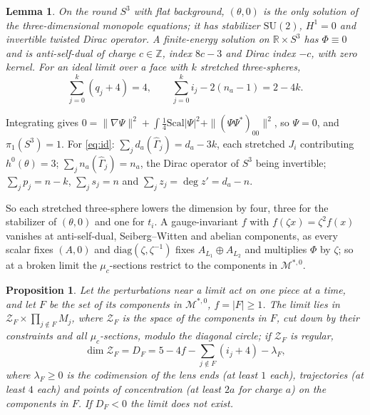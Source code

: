 \documentclass[10pt]{amsart}
\makeatletter
\numberwithin{equation}{section}
\theoremstyle{compact}
\newtheorem{proposition}[theorem]{Proposition}
\newtheorem{lemma}[theorem]{Lemma}
\renewenvironment{proof}[1][\proofname]{\par\pushQED{\qed}\normalfont
  \topsep4\p@\relax\trivlist\item[\hskip\labelsep\itshape#1\@addpunct{.}]%
  \ignorespaces}{\popQED\endtrivlist\@endpefalse}
\newcommand{\Z}{\mathbb Z}
\newcommand{\SU}{\mathrm{SU}}
\newcommand{\cM}{\mathcal M}
\newcommand{\cZ}{\mathcal Z}
\newcommand{\Ms}{\cM^{*,0}}
\makeatother
\begin{document}
\begin{lemma}\label{lem:S3}
On the round $S^3$ with flat background, $(\theta,0)$ is the only solution of
the three-dimensional monopole equations; it has stabilizer $\SU(2)$, $H^1=0$
and invertible twisted Dirac operator. A finite-energy solution on $\mathbb
R\times S^3$ has $\Phi\equiv0$ and is anti-self-dual of charge $c\in\Z$, index
$8c-3$ and Dirac index $-c$, with zero kernel. For an ideal limit over a face
with $k$ stretched three-spheres,
\begin{equation}\label{eq:id}
\textstyle\sum_{j=0}^k(q_j+4)=4,\qquad\sum_{j=0}^ki_j-2(n_a-1)=2-4k.
\end{equation}
\end{lemma}

\begin{proof}
Integrating \cite[Lemma~4.1]{FL1} gives $0=\|\nabla\Psi\|^2+\int\frac14
\mathrm{Scal}|\Psi|^2+\|(\Psi\Psi^*)_{00}\|^2$, so $\Psi=0$, and $\pi_1(S^3)=1$.
For \eqref{eq:id}: $\sum_jd_a(\hat\Gamma_j)=d_a-3k$, each stretched $J_i$
contributing $h^0(\theta)=3$; $\sum_jn_a(\hat\Gamma_j)=n_a$, the Dirac operator
of $S^3$ being invertible; $\sum_jp_j=n-k$, $\sum_js_j=n$ and $\sum_jz_j=\deg
z'=d_a-n$.
\end{proof}

So each stretched three-sphere lowers the dimension by four, three for the
stabilizer of $(\theta,0)$ and one for $t_i$. A gauge-invariant $f$ with
$f(\zeta x)=\zeta^2f(x)$ vanishes at anti-self-dual, Seiberg--Witten and abelian
components, as every scalar fixes $(A,0)$ and $\mathrm{diag}(\zeta,\zeta^{-1})$
fixes $A_{L_1}\oplus A_{L_2}$ and multiplies $\Phi$ by $\zeta$; so at a broken
limit the $\mu_c$-sections restrict to the components in $\Ms$.

\begin{proposition}\label{prop:DF}
Let the perturbations near a limit act on one piece at a time, and let $F$ be
the set of its components in $\Ms$, $f=|F|\ge1$. The limit lies in
$\cZ_F\times\prod_{j\notin F}M_j$, where $\cZ_F$ is the space of the components
in $F$, cut down by their constraints and all $\mu_c$-sections, modulo the
diagonal circle; if $\cZ_F$ is regular,
\begin{equation}\label{eq:DF}
\dim\cZ_F=D_F=5-4f-\textstyle\sum_{j\notin F}(i_j+4)-\lambda_F,
\end{equation}
where $\lambda_F\ge0$ is the codimension of the lens ends (at least $1$ each),
trajectories (at least $4$ each) and points of concentration (at least $2a$ for
charge $a$) on the components in $F$. If $D_F<0$ the limit does not exist.
\end{proposition}
\end{document}
